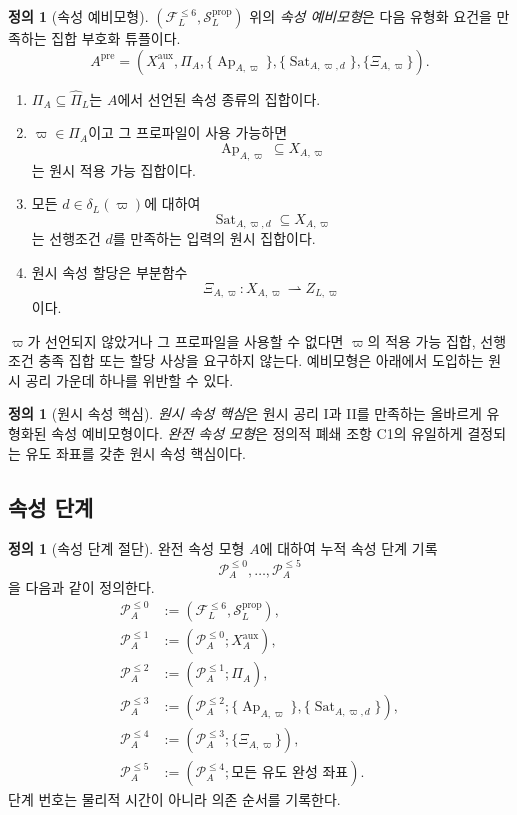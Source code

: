 \documentclass[11pt]{article}
\newcommand{\FVI}{\mathcal F_{L}^{\le 6}}
\newcommand{\Sprop}{\mathcal S_{L}^{\mathrm{prop}}}
\newcommand{\Pihat}{\widehat{\Pi}_{L}}
\newcommand{\Ap}{\operatorname{Ap}}
\newcommand{\Sat}{\operatorname{Sat}}
\theoremstyle{definition}
\newtheorem{definition}[theorem]{정의}
\theoremstyle{remark}
\begin{document}
\begin{definition}[속성 예비모형]
\label{def:premodel}
\((\FVI,\Sprop)\) 위의 \emph{속성 예비모형}은 다음 유형화 요건을 만족하는 집합 부호화 튜플이다.
\[
A^{\mathrm{pre}}=
\left(
X_A^{\mathrm{aux}},
\Pi_A,
\{\Ap_{A,\varpi}\},
\{\Sat_{A,\varpi,d}\},
\{\Xi_{A,\varpi}\}
\right).
\]
\begin{enumerate}[label=(\arabic*)]
\item \(\Pi_A\subseteq\Pihat\)는 \(A\)에서 선언된 속성 종류의 집합이다.
\item \(\varpi\in\Pi_A\)이고 그 프로파일이 사용 가능하면
\[
\Ap_{A,\varpi}\subseteq X_{A,\varpi}
\]
는 원시 적용 가능 집합이다.
\item 모든 \(d\in\delta_L(\varpi)\)에 대하여
\[
\Sat_{A,\varpi,d}\subseteq X_{A,\varpi}
\]
는 선행조건 \(d\)를 만족하는 입력의 원시 집합이다.
\item 원시 속성 할당은 부분함수
\[
\Xi_{A,\varpi}:X_{A,\varpi}\rightharpoonup Z_{L,\varpi}
\]
이다.
\end{enumerate}
\(\varpi\)가 선언되지 않았거나 그 프로파일을 사용할 수 없다면 \(\varpi\)의 적용 가능 집합, 선행조건 충족 집합 또는 할당 사상을 요구하지 않는다.
예비모형은 아래에서 도입하는 원시 공리 가운데 하나를 위반할 수 있다.
\end{definition}

\begin{definition}[원시 속성 핵심]
\emph{원시 속성 핵심}은 원시 공리 I과 II를 만족하는 올바르게 유형화된 속성 예비모형이다.
\emph{완전 속성 모형}은 정의적 폐쇄 조항 C1의 유일하게 결정되는 유도 좌표를 갖춘 원시 속성 핵심이다.
\end{definition}

\subsection{속성 단계}

\begin{definition}[속성 단계 절단]
\label{def:property-stages}
완전 속성 모형 \(A\)에 대하여 누적 속성 단계 기록
\[
\mathcal P_A^{\le0},\ldots,\mathcal P_A^{\le5}
\]
을 다음과 같이 정의한다.
\[
\begin{aligned}
\mathcal P_A^{\le0}&:=(\FVI,\Sprop),\\
\mathcal P_A^{\le1}&:=(\mathcal P_A^{\le0};X_A^{\mathrm{aux}}),\\
\mathcal P_A^{\le2}&:=(\mathcal P_A^{\le1};\Pi_A),\\
\mathcal P_A^{\le3}&:=(\mathcal P_A^{\le2};\{\Ap_{A,\varpi}\},\{\Sat_{A,\varpi,d}\}),\\
\mathcal P_A^{\le4}&:=(\mathcal P_A^{\le3};\{\Xi_{A,\varpi}\}),\\
\mathcal P_A^{\le5}&:=(\mathcal P_A^{\le4};\text{모든 유도 완성 좌표}).
\end{aligned}
\]
단계 번호는 물리적 시간이 아니라 의존 순서를 기록한다.
\end{definition}
\end{document}
